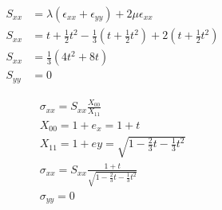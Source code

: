 \documentclass{article}
\begin{document}
\begin{align}
  S_{xx} &= \lambda(\epsilon_{xx} + \epsilon_{yy}) + 2\mu \epsilon_{xx} \\
  S_{xx} &= t + \frac{1}{2} t^2 -\frac{1}{3}(t + \frac{1}{2} t^2) + 2 (t + \frac{1}{2} t^2) \\
  S_{xx} &= \frac{1}{3}(4t^2 + 8t) \\
  S_{yy} &= 0
\end{align}

\begin{gather}
  \sigma_{xx} = S_{xx} \frac{X_{00}}{X_{11}} \\
  X_{00} = 1 + e_x = 1 + t \\
  X_{11} = 1 + ey = \sqrt{1 - \frac{2}{3}t - \frac{1}{3}t^2} \\
  \sigma_{xx} = S_{xx} \frac{1+t}{\sqrt{1 - \frac{2}{3}t - \frac{1}{3}t^2}} \\
  \sigma_{yy} = 0
\end{gather}
\end{document}
